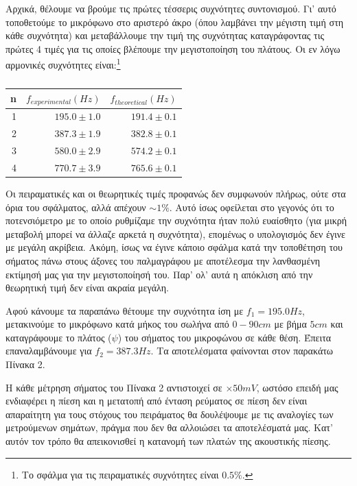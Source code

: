 \documentclass[a4paper]{article}
\begin{document}
Αρχικά, θέλουμε να βρούμε τις πρώτες τέσσερις συχνότητες συντονισμού. Γι' αυτό τοποθετούμε το μικρόφωνο στο αριστερό άκρο (όπου λαμβάνει την μέγιστη τιμή στη κάθε συχνότητα) και μεταβάλλουμε την τιμή της συχνότητας καταγράφοντας τις πρώτες 4 τιμές για τις οποίες βλέπουμε την μεγιστοποίηση του πλάτους. Οι εν λόγω αρμονικές συχνότητες είναι:\footnote{Το σφάλμα για τις πειραματικές συχνότητες είναι $0.5\%$.}
\begin{table}[h!] 
\centering 
\caption{ }
\begin{tabular}{r|r|r}
n & $f_{experimental}(Hz)$  & $f_{theoretical}(Hz)$\footnotemark\\ 
\hline \hline 
1 & $195.0\pm1.0$ & $191.4\pm0.1$\\ 
2 & $387.3\pm1.9$ & $382.8\pm0.1$\\
3 & $580.0\pm2.9$ & $574.2\pm0.1$\\
4 & $770.7\pm3.9$ & $765.6\pm0.1$\\
\end{tabular}
\end{table}

Οι πειραματικές και οι θεωρητικές τιμές προφανώς δεν συμφωνούν πλήρως, ούτε στα όρια του σφάλματος, αλλά απέχουν $\sim 1\%$. Αυτό ίσως οφείλεται στο γεγονός ότι το ποτενσιόμετρο με το οποίο ρυθμίζαμε την συχνότητα ήταν πολύ ευαίσθητο (για μικρή μεταβολή μπορεί να άλλαζε αρκετά η συχνότητα), επομένως ο υπολογισμός δεν έγινε με μεγάλη ακρίβεια. Ακόμη, ίσως να έγινε κάποιο σφάλμα κατά την τοποθέτηση του σήματος πάνω στους άξονες του παλμαγράφου με αποτέλεσμα την λανθασμένη εκτίμησή μας για την μεγιστοποίησή του. Παρ' ολ' αυτά η απόκλιση από την θεωρητική τιμή δεν είναι ακραία μεγάλη. 

Αφού κάνουμε τα παραπάνω θέτουμε την συχνότητα ίση με $f_1=195.0 Hz$, μετακινούμε το μικρόφωνο κατά μήκος του σωλήνα από $0-90cm$ με βήμα $5cm$ και καταγράφουμε το πλάτος ($\psi$) του σήματος του μικροφώνου σε κάθε θέση. Έπειτα επαναλαμβάνουμε για $f_2 = 387.3Hz$. Τα αποτελέσματα φαίνονται στον παρακάτω Πίνακα 2. 

Η κάθε μέτρηση σήματος του Πίνακα 2 αντιστοιχεί σε $\times50mV$, ωστόσο επειδή μας ενδιαφέρει η πίεση και η μετατοπή από ένταση ρεύματος σε πίεση δεν είναι απαραίτητη για τους στόχους του πειράματος θα δουλέψουμε με τις αναλογίες των μετρούμενων σημάτων, πράγμα που δεν θα αλλοιώσει τα αποτελέσματά μας. Κατ' αυτόν τον τρόπο θα απεικονισθεί η κατανομή των πλατών της ακουστικής πίεσης.
\newpage
\end{document}
